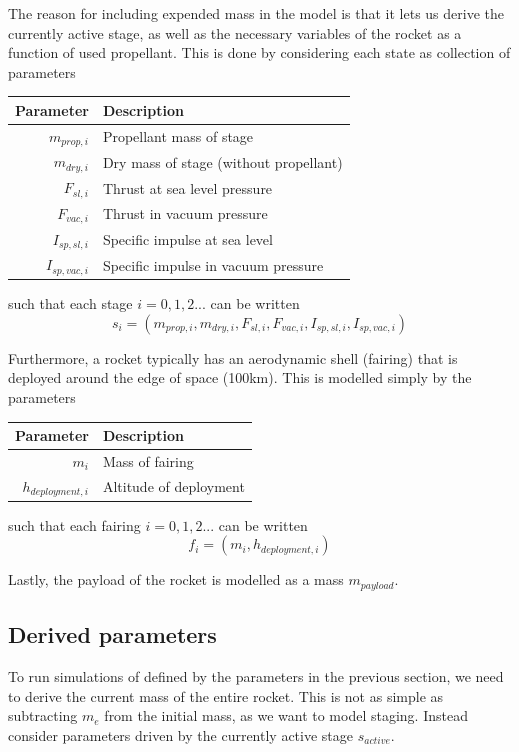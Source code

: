 \documentclass[11pt]{article}
\begin{document}
The reason for including expended mass in the model is that it lets us derive the currently active stage, 
as well as the necessary variables of the rocket as a function of used propellant. This is done by considering each state as collection of parameters
\begin{center}
\begin{tabular}{ r  | l  }
  Parameter & Description \\
  \hline
  $m_{prop,i}$ & Propellant mass of stage \\
  $m_{dry,i}$ & Dry mass of stage (without propellant) \\
  $F_{sl,i}$ & Thrust at sea level pressure \\
  $F_{vac,i}$ & Thrust in vacuum pressure \\
  $I_{sp,sl,i}$ & Specific impulse at sea level \\
  $I_{sp,vac,i}$ & Specific impulse in vacuum pressure
\end{tabular}
\end{center}

such that each stage $i=0,1,2...$ can be written
$$
s_i = (m_{prop,i}, m_{dry,i}, F_{sl,i}, F_{vac,i}, I_{sp,sl,i}, I_{sp,vac,i})
$$

Furthermore, a rocket typically has an aerodynamic shell (fairing) that is deployed around the edge of space (100km). This is modelled simply by the parameters
\begin{center}
  \begin{tabular}{ r  | l  }
    Parameter & Description \\
    \hline
    $m_i$ & Mass of fairing \\
    $h_{deployment,i}$ & Altitude of deployment
  \end{tabular}
\end{center}
such that each fairing $i=0,1,2...$ can be written
$$
f_i = (m_i, h_{deployment,i})
$$

Lastly, the payload of the rocket is modelled as a mass $m_{payload}$.

\subsection{Derived parameters}
To run simulations of defined by the parameters in the previous section, 
we need to derive the current mass of the entire rocket. This is not as simple as subtracting $m_e$ from the initial mass, as we want to model staging.
Instead consider parameters driven by the currently active stage $s_{active}$.
\end{document}
